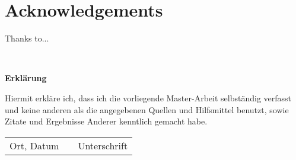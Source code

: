 \documentclass[../../main.tex]{subfiles}
\begin{document}
 
\newpage
 \printbibliography[title={Bibliography}]
\newpage

\chapter*{Acknowledgements}
Thanks to...

\newpage
  
\thispagestyle{empty}
\
\vspace{10em}

\LARGE\textbf{Erklärung} \\[2em]
\Large{}

Hiermit erkläre ich, dass ich die vorliegende Master-Arbeit selbständig verfasst und keine anderen als die angegebenen Quellen und Hilfsmittel benutzt, sowie Zitate und Ergebnisse Anderer kenntlich gemacht habe. \\[4em]

\begin{tabular}{lll}
	Ort, Datum & \hspace{11em} & Unterschrift
\end{tabular}
           
\end{document}
